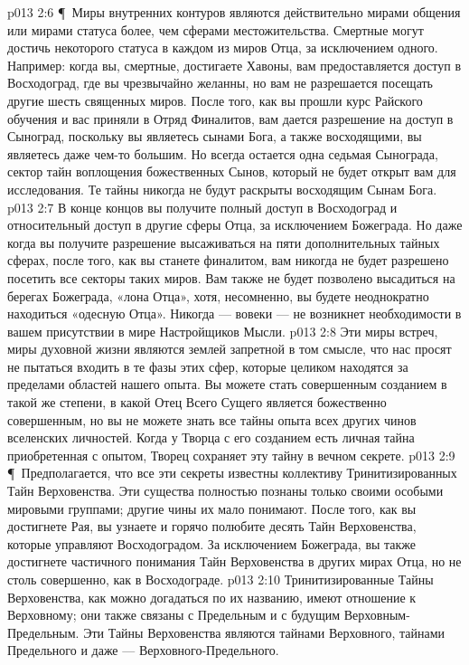 \vs p013 2:6 \P\ Миры внутренних контуров являются действительно мирами общения или мирами статуса более, чем сферами местожительства. Смертные могут достичь некоторого статуса в каждом из миров Отца, за исключением одного. Например: когда вы, смертные, достигаете Хавоны, вам предоставляется доступ в Восходоград, где вы чрезвычайно желанны, но вам не разрешается посещать другие шесть священных миров. После того, как вы прошли курс Райского обучения и вас приняли в Отряд Финалитов, вам дается разрешение на доступ в Сыноград, поскольку вы являетесь сынами Бога, а также восходящими, вы являетесь даже чем\hyp{}то большим. Но всегда остается одна седьмая Сынограда, сектор тайн воплощения божественных Сынов, который не будет открыт вам для исследования. Те тайны никогда не будут раскрыты восходящим Сынам Бога.
\vs p013 2:7 В конце концов вы получите полный доступ в Восходоград и относительный доступ в другие сферы Отца, за исключением Божеграда. Но даже когда вы получите разрешение высаживаться на пяти дополнительных тайных сферах, после того, как вы станете финалитом, вам никогда не будет разрешено посетить все секторы таких миров. Вам также не будет позволено высадиться на берегах Божеграда, «лона Отца», хотя, несомненно, вы будете неоднократно находиться «одесную Отца». Никогда --- вовеки --- не возникнет необходимости в вашем присутствии в мире Настройщиков Мысли.
\vs p013 2:8 Эти миры встреч, миры духовной жизни являются землей запретной в том смысле, что нас просят не пытаться входить в те фазы этих сфер, которые целиком находятся за пределами областей нашего опыта. Вы можете стать совершенным созданием в такой же степени, в какой Отец Всего Сущего является божественно совершенным, но вы не можете знать все тайны опыта всех других чинов вселенских личностей. Когда у Творца с его созданием есть личная тайна приобретенная с опытом, Творец сохраняет эту тайну в вечном секрете.
\vs p013 2:9 \P\ Предполагается, что все эти секреты известны коллективу Тринитизированных Тайн Верховенства. Эти существа полностью познаны только своими особыми мировыми группами; другие чины их мало понимают. После того, как вы достигнете Рая, вы узнаете и горячо полюбите десять Тайн Верховенства, которые управляют Восходоградом. За исключением Божеграда, вы также достигнете частичного понимания Тайн Верховенства в других мирах Отца, но не столь совершенно, как в Восходограде.
\vs p013 2:10 Тринитизированные Тайны Верховенства, как можно догадаться по их названию, имеют отношение к Верховному; они также связаны с Предельным и с будущим Верховным\hyp{}Предельным. Эти Тайны Верховенства являются тайнами Верховного, тайнами Предельного и даже --- Верховного\hyp{}Предельного.
